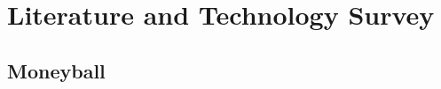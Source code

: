 \documentclass[12pt,a4paper]{report}
\theoremstyle{definition}
\begin{document}
%
%
%
%
%
%
%

\chapter{Literature and Technology Survey}

\section{Moneyball}
\end{document}
